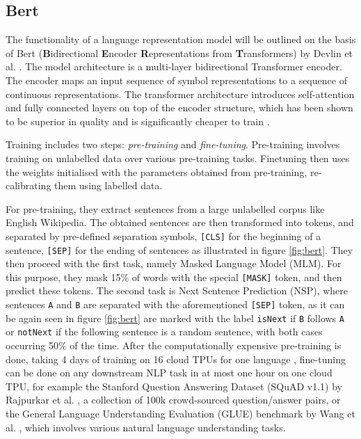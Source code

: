 \subsection{Bert \label{Bert}}
The functionality of a language representation model will be outlined on the basis of Bert (\textbf{B}idirectional \textbf{E}ncoder \textbf{R}epresentations from \textbf{T}ransformers) by Devlin et al. \cite{devlin2018bert}. The model architecture is a multi-layer bidirectional Transformer encoder. The encoder maps an input sequence of symbol representations to a sequence of continuous representations. The transformer architecture introduces self-attention and fully connected layers on top of the encoder structure, which has been shown to be superior in quality and is significantly cheaper to train \cite{vaswani2017attention}.

Training includes two steps: \textit{pre-training} and \textit{fine-tuning}. Pre-training involves training on unlabelled data over various pre-training tasks. Finetuning then uses the weights initialised with the parameters obtained from pre-training, re-calibrating them using labelled data.

For pre-training, they extract sentences from a large unlabelled corpus like English Wikipedia. The obtained sentences are then transformed into tokens, and separated by pre-defined separation symbols, \verb![CLS]! for the beginning of a sentence, \verb![SEP]! for the ending of sentences as illustrated in figure \ref{fig:bert}. They then proceed with the first task, namely Masked Language Model (MLM). For this purpose, they mask 15\% of words with the special \verb![MASK]! token, and then predict these tokens. The second task is Next Sentence Prediction (NSP), where sentences \verb!A! and \verb!B! are separated with the aforementioned \verb![SEP]! token, as it can be again seen in figure \ref{fig:bert} are marked with the label \verb!isNext! if \verb!B! follows \verb!A! or \verb!notNext! if the following sentence is a random sentence, with both cases occurring 50\% of the time. After the computationally expensive pre-training is done, taking 4 days of training on 16 cloud TPUs for one language \cite{googlebert}, fine-tuning can be done on any downstream NLP task in at most one hour on one cloud TPU, for example the Stanford Question Answering Dataset (SQuAD v1.1) by Rajpurkar et al. \cite{rajpurkar2016squad}, a collection of 100k crowd-sourced question/answer pairs, or the General Language Understanding Evaluation (GLUE) benchmark by Wang et al. \cite{wang2018glue}, which involves various natural language understanding tasks. 


